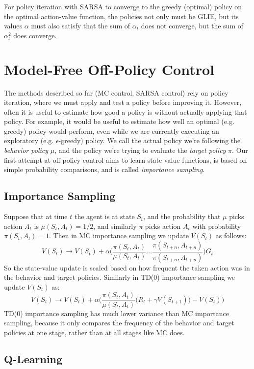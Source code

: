 \documentclass{article}
\newcommand{\ita}{\textit}
\newcommand{\eps}{\epsilon}
\begin{document}
For policy iteration with SARSA to converge to the greedy (optimal) policy on the optimal action-value function, the policies not only must be GLIE, but its values $\alpha$ must also satisfy that the sum of $\alpha_t$ does not converge, but the sum of $\alpha^2_t$ does converge.

\section{Model-Free Off-Policy Control}

The methods described so far (MC control, SARSA control) rely on policy iteration, where we must apply and test a policy before improving it. However, often it is useful to estimate how good a policy is without actually applying that policy. For example, it would be useful to estimate how well an optimal (e.g. greedy) policy would perform, even while we are currently executing an exploratory (e.g. $\eps$-greedy) policy. We call the actual policy we're following the \ita{behavior policy} $\mu$, and the policy we're trying to evaluate the \ita{target policy} $\pi$. Our first attempt at off-policy control aims to learn state-value functions, is based on simple probability comparisons, and is called \ita{importance sampling}.

\subsection{Importance Sampling}
Suppose that at time $t$ the agent is at state $S_t$, and the probability that $\mu$ picks action $A_t$ is $\mu(S_t, A_t) = 1/2$, and similarly $\pi$ picks action $A_t$ with probability $\pi(S_t, A_t) = 1$. Then in MC importance sampling we update $V(S_t)$ as follows:
$$V(S_t) \rightarrow V(S_t) + \alpha\bigg(\frac{\pi(S_t, A_t)}{\mu(S_t, A_t)}\ldots\frac{\pi(S_{t+n}, A_{t+n})}{\pi(S_{t+n}, A_{t+n})}\bigg)G_t$$
So the state-value update is scaled based on how frequent the taken action was in the behavior and target policies. Similarly in TD(0) importance sampling we update $V(S_t)$ as:
$$V(S_t) \rightarrow V(S_t) + \alpha\bigg(\frac{\pi(S_t, A_t)}{\mu(S_t, A_t)} \big(R_t + \gamma V(S_{t+1})\big)- V(S_t)\bigg)$$
TD(0) importance sampling has much lower variance than MC importance sampling, because it only compares the frequency of the behavior and target policies at one stage, rather than at all stages like MC does.

\subsection{Q-Learning}
\end{document}
